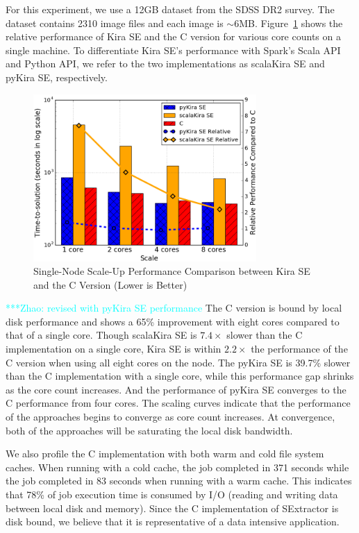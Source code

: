 \documentclass[10pt,journal,compsoc]{IEEEtran}
\newcommand{\zhaonote}[1]{{\textcolor{cyan}    { ***Zhao:      #1 }}}
\newcommand{\zhaonote}[1]{}
\begin{document}
For this experiment, we use a 12GB dataset from the SDSS DR2 survey. The dataset contains
2310 image files and each image is $\sim$6MB.
Figure~\ref{fig:scaleup} shows the relative
performance of Kira SE and the C version for various core counts on a single machine.
To differentiate Kira SE's performance with Spark's Scala API and Python API, we refer
to the two implementations as scalaKira SE and pyKira SE, respectively.

\begin{figure}[h]
	\begin{center}
		\includegraphics[width=85mm]{pictures/scaleup}
		\caption{Single-Node Scale-Up Performance Comparison between Kira SE and the C Version (Lower is Better)
		\label{fig:scaleup}}
  	\end{center}
\end{figure}

\zhaonote{revised with pyKira SE performance}
The C version is bound by local disk performance and shows a 65\% improvement with
eight cores compared to that of a single core. 
Though scalaKira SE is $7.4\times$ slower than the C implementation
on a single core, Kira SE is within $2.2\times$ the performance of the C version when using all eight cores on the node.
The pyKira SE is 39.7\% slower than the C implementation with a single core, while this performance gap
shrinks as the core count increases. And the performance of pyKira SE converges to the C performance from four cores.
The scaling curves indicate that the performance of the approaches begins to converge
as core count increases. At convergence, both of the approaches will be saturating the local
disk bandwidth.

We also profile the C implementation with both warm and cold file system caches. When running with a
cold cache, the job completed in 371 seconds while the job completed in 83 seconds when
running with a warm cache. This indicates that 78\% of job execution time is consumed by
I/O (reading and writing data between local disk and memory). Since the C implementation of
SExtractor is disk bound, we believe that it is representative of a data intensive application. 
\end{document}

